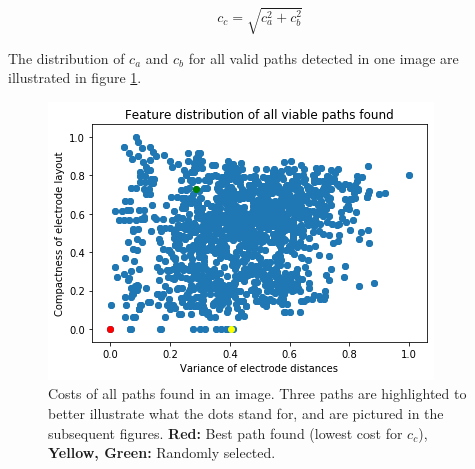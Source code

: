 \documentclass[a4paper, 10pt, twocolumn]{article}
\begin{document}
$$c_{c} = \sqrt{c_a^2+c_b^2}$$

The distribution of $c_a$ and $c_b$ for all valid paths detected in one image are illustrated in figure \ref{feature_distribution}.

\begin{figure}[ht]
	\centering
  \includegraphics[width=.5\textwidth]{feature_distribution.png}
	\caption{Costs of all paths found in an image. Three paths are highlighted to better illustrate what the dots stand for, and are pictured in the subsequent figures. \textbf{Red:} Best path found (lowest cost for $c_c$), \textbf{Yellow, Green:} Randomly selected.}
	\label{feature_distribution}
\end{figure}
\end{document}
